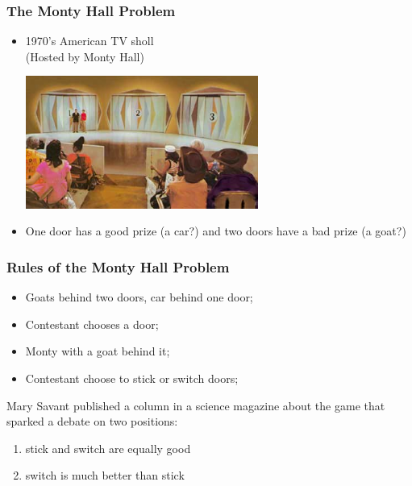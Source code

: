 \documentclass{beamer}
\begin{document}
\begin{frame}
  \frametitle{The Monty Hall Problem}
  {\larger

    \begin{itemize}
    \item 1970's American TV sholl \\
      \hfill(Hosted by Monty Hall)

      \begin{center}
        \includegraphics[width=0.6\textwidth]{../img/montyhall}
      \end{center}
      
    \item One door has a good prize (a car?) and two doors have a bad
      prize (a goat?)
    \end{itemize}
  }  
\end{frame}

\begin{frame}
  \frametitle{Rules of the Monty Hall Problem}

  {\large
    \begin{itemize}
    \item Goats behind two doors, car behind one door;
    \item Contestant \alert{chooses a door};
    \item Monty  with a goat behind it;
    \item Contestant choose to \alert{stick or switch} doors;
    \end{itemize}
    \vfill
    
    Mary Savant published a column in a science magazine about the
    game that sparked a debate on two positions:
    \begin{enumerate}
    \item \alert{stick and switch} are equally good
    \item \alert{switch} is much better than \alert{stick}
    \end{enumerate}
  }
\end{frame}
\end{document}
